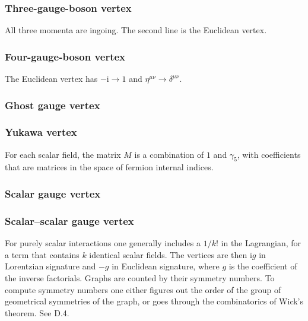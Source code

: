 \subsubsection{Three-gauge-boson vertex}

All three momenta are ingoing. The second line is the Euclidean vertex.

\BanksDFourGaugeVertex

\subsubsection{Four-gauge-boson vertex}

The Euclidean vertex has \(-\mathrm{i}\to1\) and \(\eta^{\mu\nu}\to\delta^{\mu\nu}\).

\BanksDFourGaugeFormula

\BanksDGhostGaugeVertex

\subsubsection{Ghost gauge vertex}

\BanksDYukawaVertex

\subsubsection{Yukawa vertex}

For each scalar field, the matrix \(M\) is a combination of \(1\) and \(\gamma_5\),
with coefficients that are matrices in the space of fermion internal indices.

\BanksDScalarGaugeVertex

\subsubsection{Scalar gauge vertex}

\BanksDScalarScalarGaugeVertex

\subsubsection{Scalar--scalar gauge vertex}

For purely scalar interactions one generally includes a \(1/k!\) in the Lagrangian,
for a term that contains \(k\) identical scalar fields. The vertices are then
\(\mathrm{i}g\) in Lorentzian signature and \(-g\) in Euclidean signature, where
\(g\) is the coefficient of the inverse factorials. Graphs are counted by their
symmetry numbers. To compute symmetry numbers one either figures out the order of
the group of geometrical symmetries of the graph, or goes through the combinatorics
of Wick's theorem. See D.4.

